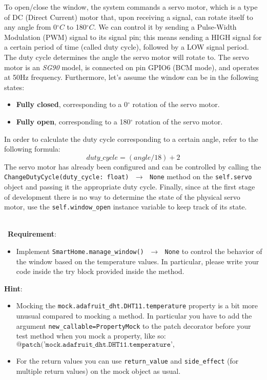 To open/close the window, the system commands a servo motor, which is a type of DC (Direct Current) motor that, upon receiving a signal, can rotate itself to any angle from 0$^{\circ}C$ to 180$^{\circ}C$. We can control it by sending a Pulse-Width Modulation (PWM) signal to its signal pin; this means sending a HIGH signal for a certain period of time (called duty cycle), followed by a LOW signal period. The duty cycle determines the angle the servo motor will rotate to.
The servo motor is an \textit{SG90} model, is connected on pin GPIO6 (BCM mode), and operates at 50Hz frequency. Furthermore, let's assume the window can be in the following states:
\begin{itemize}
    \item \textbf{Fully closed}, corresponding to a 0$^{\circ}$ rotation of the servo motor.
    \item \textbf{Fully open}, corresponding to a 180$^{\circ}$ rotation of the servo motor.
\end{itemize}

In order to calculate the duty cycle corresponding to a certain angle, refer to the following formula:
\[
    duty\_cycle = (angle / 18) + 2
\]
The servo motor has already been configured and can be controlled by calling the \texttt{ChangeDutyCycle(duty\_cycle: float) $\,\to\,$ None} method on the \texttt{self.servo} object and passing it the appropriate duty cycle.
Finally, since at the first stage of development there is no way to determine the state of the physical servo motor, use the \texttt{self.window\_open} instance variable to keep track of its state.

\ \\ \
\noindent\textbf{Requirement}:
\begin{itemize}
    \item Implement \texttt{SmartHome.manage\_window() $\,\to\,$ None} to control the behavior of the window based on the temperature values. In particular, please write your code inside the try block provided inside the method.
\end{itemize}

\noindent\textbf{Hint}:
\begin{itemize}
    \item Mocking the \texttt{mock.adafruit\_dht.DHT11.temperature} property is a bit more unusual compared to mocking a method. In particular you have to add the argument \texttt{new\_callable=PropertyMock} to the patch decorator before your test method when you mock a property, like so:
    \[
        \texttt{@patch('mock.adafruit\_dht.DHT11.temperature', new\_callable=PropertyMock)}
    \]
    \item For the return values you can use \texttt{return\_value} and \texttt{side\_effect} (for multiple return values) on the mock object as usual.
\end{itemize}


